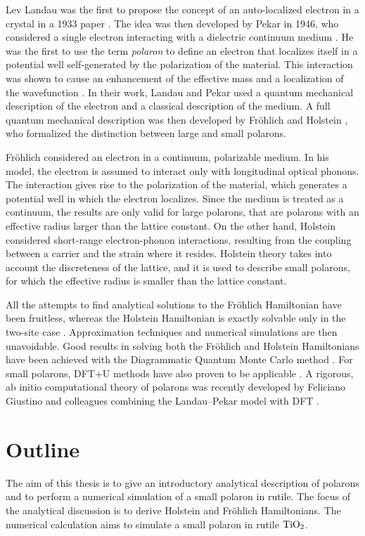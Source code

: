 Lev Landau was the first to propose the concept of an auto-localized electron in a crystal in a 1933 paper \cite{terhaar1965}. The idea was then developed by Pekar in 1946, who considered a single electron interacting with a dielectric continuum medium \cite{pekar1946, pekar1947}. He was the first to use the term \emph{polaron} to define an electron that localizes itself in a potential well self-generated by the polarization of the material. This interaction was shown to cause an enhancement of the effective mass and a localization of the wavefunction \cite{landau1948}. In their work, Landau and Pekar used a quantum mechanical description of the electron and a classical description of the medium. A full quantum mechanical description was then developed by Fröhlich \cite{frohlich1950} and Holstein \cite{holstein1959}, who formalized the distinction between large and small polarons.

Fröhlich considered an electron in a continuum, polarizable medium. In his model, the electron is assumed to interact only with longitudinal optical phonons. The interaction gives rise to the polarization of the material, which generates a potential well in which the electron localizes. Since the medium is treated as a continuum, the results are only valid for large polarons, that are polarons with an effective radius larger than the lattice constant. On the other hand, Holstein considered short-range electron-phonon interactions, resulting from the coupling between a carrier and the strain where it resides. Holstein theory takes into account the discreteness of the lattice, and it is used to describe small polarons, for which the effective radius is smaller than the lattice constant.

All the attempts to find analytical solutions to the Fröhlich Hamiltonian have been fruitless, whereas the Holstein Hamiltonian is exactly solvable only in the two-site case \cite{rongsheng2002}. Approximation techniques and numerical simulations are then unavoidable. Good results in solving both the Fröhlich and Holstein Hamiltonians have been achieved with the Diagrammatic Quantum Monte Carlo method \cite{prokofev1998,mishchenko2000}. For small polarons, DFT+U methods have also proven to be applicable \cite{kokott2018}. A rigo­rous, ab initio computational theory of polarons was recently developed by Feliciano Giustino and colleagues combining the Landau–Pekar model with DFT \cite{sio2019}.

\section*{Outline}
The aim of this thesis is to give an introductory analytical description of polarons and to perform a numerical simulation of a small polaron in rutile. The focus of the analytical discussion is to derive Holstein and Fröhlich Hamiltonians. The numerical calculation aims to simulate a small polaron in rutile $\ce{TiO_2}$.

